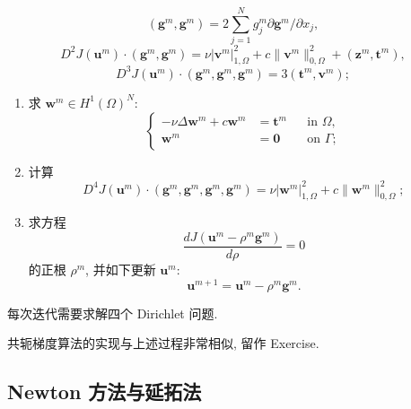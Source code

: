 \begin{enumerate}
\[(\boldsymbol g^m,\boldsymbol g^m)
=2\sum_{j=1}^Ng_j^m\partial\boldsymbol g^m/\partial x_j,
\]
\begin{equation}
\label{eq:navier-least-squares-second-derivative-value}
D^2J(\boldsymbol u^m)\mathbin{\cdot}(\boldsymbol g^m,\boldsymbol g^m)
=\nu|\boldsymbol v^m|_{1,\Omega}^2
+c\|\boldsymbol v^m\|_{0,\Omega}^2+(\boldsymbol z^m,\boldsymbol t^m),
\end{equation}
\begin{equation}
\label{eq:navier-least-squares-third-derivative-value}
D^3J(\boldsymbol u^m)\mathbin{\cdot}(\boldsymbol g^m,\boldsymbol g^m,\boldsymbol g^m)
=3(\boldsymbol t^m,\boldsymbol v^m);
\end{equation}
\end{enumerate}

\begin{enumerate}
\item[6$^\circ$)] 求 $\boldsymbol w^m\in H^1(\Omega)^N$:
\[
\left\{
\begin{aligned}
-\nu\Delta\boldsymbol w^m+c\boldsymbol w^m&=\boldsymbol t^m&&\text{in }\Omega,\\
\boldsymbol w^m&=\boldsymbol0&&\text{on }\Gamma;
\end{aligned}
\right.
\]
\item[7$^\circ$)] 计算
\begin{equation}
\label{eq:navier-least-squares-fourth-derivative-value}
D^4J(\boldsymbol u^m)\mathbin{\cdot}
(\boldsymbol g^m,\boldsymbol g^m,\boldsymbol g^m,\boldsymbol g^m)
=\nu|\boldsymbol w^m|_{1,\Omega}^2
+c\|\boldsymbol w^m\|_{0,\Omega}^2;
\end{equation}
\item[8$^\circ$)] 求方程
\[
\frac{dJ(\boldsymbol u^m-\rho^m\boldsymbol g^m)}{d\rho}=0
\]
的正根 $\rho^m$, 并如下更新 $\boldsymbol u^m$:
\[
\boldsymbol u^{m+1}=\boldsymbol u^m-\rho^m\boldsymbol g^m.
\]
\end{enumerate}
每次迭代需要求解四个 Dirichlet 问题.

共轭梯度算法的实现与上述过程非常相似, 留作 Exercise.

\subsection{Newton 方法与延拓法}
\label{subsec:navier-newton-continuation}


